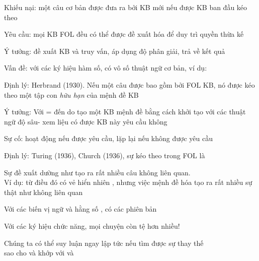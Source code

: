 \documentclass{article}
\begin{document}
\begin{huge}

Khiếu nại: một câu cơ bản\mat{$^*$} được đưa ra bởi KB mới nếu được KB ban đầu kéo theo

Yêu cầu: mọi KB FOL đều có thể được đề xuất hóa để duy trì quyền thừa kế

Ý tưởng: đề xuất KB và truy vấn, áp dụng độ phân giải, trả về kết quả

Vấn đề: với các ký hiệu hàm số, có vô số thuật ngữ cơ bản,\al
  ví dụ: 

Định lý: Herbrand (1930). Nếu một câu \mat{$\alpha$} được bao gồm bởi FOL KB,\nl
  nó được kéo theo một tập con \emph{hữu hạn} của mệnh đề KB

Ý tưởng: Với  =  đến \mat{$\infty$} do\nl
    tạo một KB mệnh đề bằng cách khởi tạo với các thuật ngữ độ sâu-\nl
    xem liệu \mat{$\alpha$} có được KB này yêu cầu không

Sự cố: hoạt động nếu \mat{$\alpha$} được yêu cầu, lặp lại nếu \mat{$\alpha$} không được yêu cầu

Định lý: Turing (1936), Church (1936), sự kéo theo trong FOL là 



Sự đề xuất dường như tạo ra rất nhiều câu không liên quan.\\
Ví dụ: từ 
điều đó có vẻ hiển nhiên , nhưng việc mệnh đề hóa tạo ra
rất nhiều sự thật như  không liên quan

Với các biến vị ngữ   và hằng số , có các phiên bản 

Với các ký hiệu chức năng, mọi chuyện còn tệ hơn nhiều!




Chúng ta có thể suy luận ngay lập tức nếu tìm được sự thay thế \mat{$\theta$}\\
sao cho  và  khớp với  và 


\end{huge}
\end{document}
